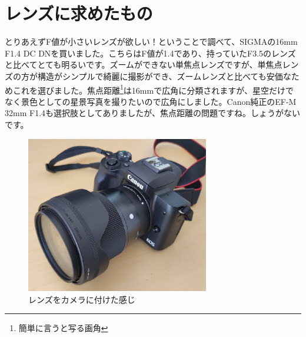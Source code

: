 \documentclass[a4paper.10pt]{jarticle}
\begin{document}
\section{レンズに求めたもの}
とりあえずF値が小さいレンズが欲しい！ということで調べて、SIGMAの16mm F1.4 DC DNを買いました。こちらはF値が1.4であり、持っていたF3.5のレンズと比べてとても明るいです。ズームができない単焦点レンズですが、単焦点レンズの方が構造がシンプルで綺麗に撮影ができ、ズームレンズと比べても安価なためこれを選びました。焦点距離\footnote{簡単に言うと写る画角}は16mmで広角に分類されますが、星空だけでなく景色としての星景写真を撮りたいので広角にしました。Canon純正のEF-M 32mm F1.4も選択肢としてありましたが、焦点距離の問題ですね。しょうがないです。
\begin{figure}
	\begin{center}
		\includegraphics[width=8cm]{don.jpg}
		\caption{レンズをカメラに付けた感じ}
		\label{}
	\end{center}
\end{figure}
\end{document}
